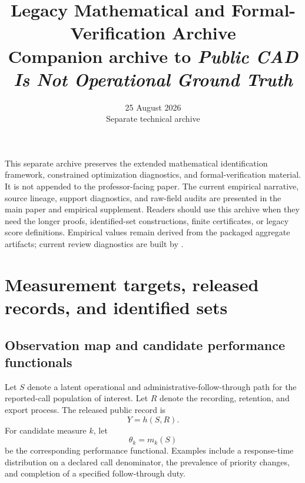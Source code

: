 \documentclass[11pt]{article}
\title{\vspace{-1.6em}\textbf{Legacy Mathematical and Formal-Verification Archive}\\[0.35em]
\large Companion archive to \emph{Public CAD Is Not Operational Ground Truth}}
\author{}
\date{25 August 2026\\[0.2em]\small Separate technical archive}
\begin{document}
\maketitle
\thispagestyle{plain}
\vspace{-1.2em}

\begin{plainbox}[title=Purpose and reading guide]
This separate archive preserves the extended mathematical identification framework, constrained optimization diagnostics, and formal-verification material. It is not appended to the professor-facing paper. The current empirical narrative, source lineage, support diagnostics, and raw-field audits are presented in the main paper and empirical supplement. Readers should use this archive when they need the longer proofs, identified-set constructions, finite certificates, or legacy score definitions. Empirical values remain derived from the packaged aggregate artifacts; current review diagnostics are built by .
\end{plainbox}

\setcounter{tocdepth}{1}
\begingroup
\small
\tableofcontents
\endgroup
\newpage

\section{Measurement targets, released records, and identified sets}
\label{sec:measurement_map}

\subsection{Observation map and candidate performance functionals}

Let $S$ denote a latent operational and administrative-follow-through path for the reported-call population of interest. Let $R$ denote the recording, retention, and export process. The released public record is
\begin{equation}
Y=h(S,R).
\label{eq:observation_map}
\end{equation}
For candidate measure $k$, let
\begin{equation}
\theta_k=m_k(S)
\label{eq:performance_functional}
\end{equation}
be the corresponding performance functional. Examples include a response-time distribution on a declared call denominator, the prevalence of priority changes, and completion of a specified follow-through duty.
\end{document}
